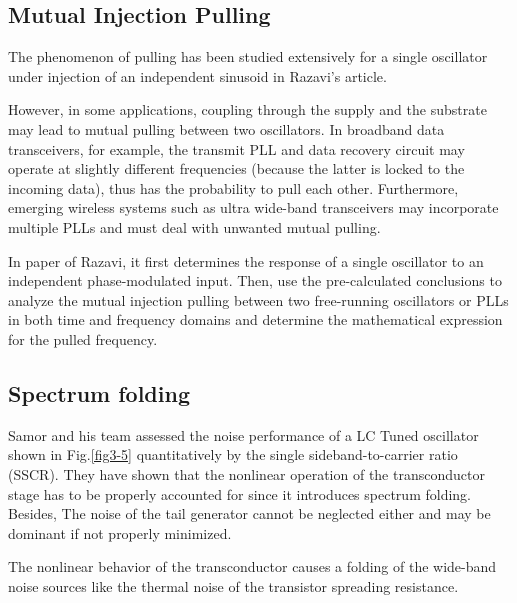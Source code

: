 \documentclass[conference]{IEEEtran}
\begin{document}
\subsection{Mutual Injection Pulling}
The phenomenon of pulling has been studied extensively for a single oscillator under injection of an independent sinusoid in 
Razavi's article\cite{b5}. 

However, in some applications, coupling through the supply and the substrate may lead to mutual pulling between two oscillators. In broadband data transceivers, for example, the transmit PLL and data recovery circuit may operate at slightly different frequencies (because the latter is locked to the incoming data), thus has the probability to pull each other. Furthermore, emerging wireless systems such as ultra wide-band transceivers may incorporate multiple PLLs and must
deal with unwanted mutual pulling.

In paper\cite{b2} of Razavi, it first determines the response of a single oscillator to an independent phase-modulated input. Then, use the pre-calculated conclusions to analyze the mutual injection pulling between two free-running oscillators or PLLs in both time and frequency domains and determine the mathematical expression for the pulled frequency.


\subsection{Spectrum folding}
Samor and his team\cite{b1} assessed the noise performance of a LC Tuned oscillator shown in Fig.\ref{fig3-5} quantitatively by the single sideband-to-carrier ratio (SSCR). They have shown that the nonlinear operation of the transconductor stage has to be properly accounted for since it introduces spectrum folding. Besides, The noise of the tail generator cannot be neglected either and may be dominant if not properly minimized.

The nonlinear behavior of the transconductor causes a folding of the wide-band noise sources like the thermal noise of the transistor spreading resistance. 
\end{document}
